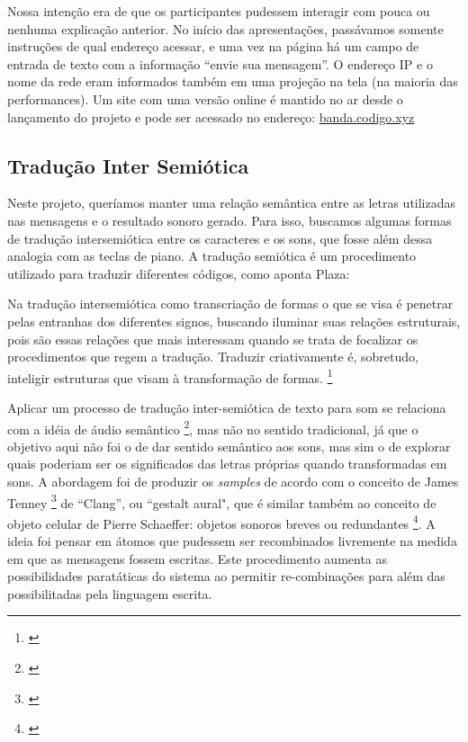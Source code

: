 Nossa intenção era de que os participantes pudessem interagir com pouca ou nenhuma explicação anterior. No início das apresentações, passávamos somente instruções de qual endereço acessar, e uma vez na página há um campo de entrada de texto com a informação ``envie sua mensagem''. O endereço IP e o nome da rede eram informados também em uma projeção na tela (na maioria das performances). Um site com uma versão online é mantido no ar desde o lançamento do projeto e pode ser acessado no endereço: \url{banda.codigo.xyz}




\subsection{Tradução Inter Semiótica}
\label{sec:trad}

%

Neste projeto, queríamos manter uma relação semântica entre as letras utilizadas nas mensagens e o resultado sonoro gerado. Para isso, buscamos algumas formas de tradução intersemiótica entre os caracteres e os sons, que fosse além dessa analogia com as teclas de piano. A tradução semiótica é um procedimento utilizado para traduzir diferentes códigos, como aponta Plaza: 

\begin{citacao}
Na tradução intersemiótica como transcriação de formas o que se visa é penetrar pelas entranhas dos diferentes signos, buscando iluminar suas relações estruturais, pois são essas relações que mais interessam quando se trata de focalizar os procedimentos que regem a tradução. Traduzir criativamente é, sobretudo, inteligir estruturas que visam à transformação de formas. \footnote{\cite[71]{JulioPlaza1969}}
\end{citacao}

Aplicar um processo de tradução inter-semiótica de texto para som se relaciona com a idéia de áudio semântico \footnote{\cite{Kostek:2010}}, mas não no sentido tradicional, já que o objetivo aqui não foi o de dar sentido semântico aos sons, mas sim o de explorar quais poderiam ser os significados das letras próprias quando transformadas em sons. A abordagem foi de produzir os \emph{samples} de acordo com o conceito de James Tenney \footnote{\cite{Tenney1988}} de ``Clang'', ou ``gestalt aural", que é similar também ao conceito de objeto celular de Pierre Schaeffer: objetos sonoros breves ou redundantes \footnote{\cite{Chion1983}}. A ideia foi pensar em átomos que pudessem ser recombinados livremente na medida em que as mensagens fossem escritas. Este procedimento aumenta as possibilidades paratáticas do sistema ao permitir re-combinações para além das possibilitadas pela linguagem escrita.


